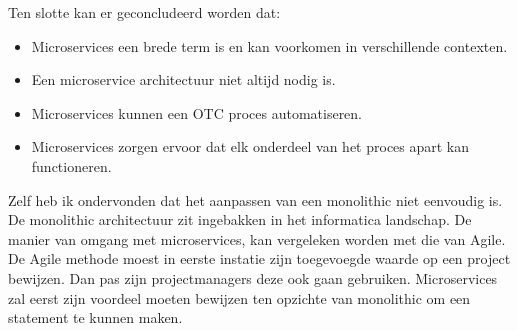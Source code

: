Ten slotte kan er geconcludeerd worden dat:
\begin{itemize}
	\item Microservices een brede term is en kan voorkomen in verschillende contexten.
	\item Een microservice architectuur niet altijd nodig is.
	\item Microservices kunnen een OTC proces automatiseren.
	\item Microservices zorgen ervoor dat elk onderdeel van het proces apart kan functioneren.
\end{itemize}

Zelf heb ik ondervonden dat het aanpassen van een monolithic niet eenvoudig is. De monolithic architectuur zit ingebakken in het informatica landschap. De manier van omgang met microservices, kan vergeleken worden met die van Agile. De Agile methode moest in eerste instatie zijn toegevoegde waarde op een project bewijzen. Dan pas zijn projectmanagers deze ook gaan gebruiken. Microservices zal eerst zijn voordeel moeten bewijzen ten opzichte van monolithic om een statement te kunnen maken.



